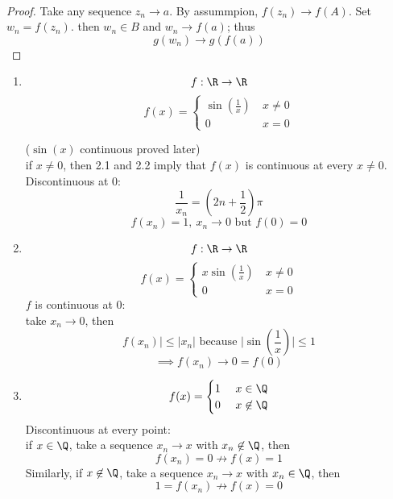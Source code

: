 \begin{theorem}
\\
\begin{proof}
Take any sequence $z_n\to a$. By assummpion, $f(z_n) \to f(A)$. Set $w_n = f(z_n)$. then $w_n\in B$ and $w_n\to f(a)$; thus
\[g(w_n) \to g(f(a))\]
\end{proof}
\end{theorem}
\begin{example}
\hfill{ }
\begin{enumerate}
    \item \[f:\R\to \R\]
    \[f(x) = \begin{cases} \sin(\frac{1}{x}) \ &x \neq 0\\ 0 \ & x = 0\end{cases}\]

($\sin(x)$ continuous proved later)\\
if $x\neq 0$, then 2.1 and 2.2 imply that $f(x)$ is continuous at every $x\neq 0$.\\
Discontinuous at 0:
\[\frac{1}{x_n}= (2n+\frac{1}{2})\pi\]
\[f(x_n) = 1, \ x_n\to 0\text{ but }f(0)=0\]
\item \[f:\R\to \R\]
\[f(x) = \begin{cases} x\sin(\frac{1}{x}) \ &x \neq 0\\ 0 \ & x = 0\end{cases}\]
$f$ is continuous at 0:\\
take $x_n\to 0$, then
\[f(x_n)|\leq |x_n|\text{ because }|\sin(\frac{1}{x})|\leq 1\]
\[\implies f(x_n) \to 0 = f(0)\]
\item \[f(x) = \begin{cases}1 \ &x\in \Q\\0 & x\not \in \Q \end{cases}\]
Discontinuous at every point:\\
if $x\in \Q$, take a sequence $x_n\to x$ with $x_n\not \in \Q$, then 
\[f(x_n)=0 \not \to f(x) = 1\]
Similarly, if $x\not \in \Q$, take a sequence $x_n\to x$ with $x_n\in \Q$, then
\[1 = f(x_n)\not \to f(x) = 0\]
\end{enumerate}
\end{example}
